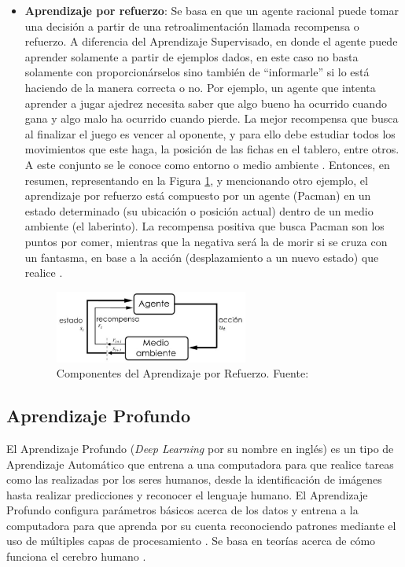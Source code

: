 \begin{itemize}
	\item \textbf{Aprendizaje por refuerzo}: Se basa en que un agente racional puede tomar una decisión a partir de una retroalimentación llamada recompensa o refuerzo. A diferencia del Aprendizaje Supervisado, en donde el agente puede aprender solamente a partir de ejemplos dados, en este caso no basta solamente con proporcionárselos sino también de “informarle” si lo está haciendo de la manera correcta o no. Por ejemplo, un agente que intenta aprender a jugar ajedrez necesita saber que algo bueno ha ocurrido cuando gana y algo malo ha ocurrido cuando pierde. La mejor recompensa que busca al finalizar el juego es vencer al oponente, y para ello debe estudiar todos los movimientos que este haga, la posición de las fichas en el tablero, entre otros. A este conjunto se le conoce como entorno o medio ambiente \parencite{bk_russell2004intart}. Entonces, en resumen, representando en la Figura \ref{2:fig4}, y mencionando otro ejemplo, el aprendizaje por refuerzo está compuesto por un agente (Pacman) en un estado determinado (su ubicación o posición actual) dentro de un medio ambiente (el laberinto). La recompensa positiva que busca Pacman son los puntos por comer, mientras que la negativa será la de morir si se cruza con un fantasma, en base a la acción (desplazamiento a un nuevo estado) que realice \parencite{tec_merino2019aprendrefuerzo}.
	\begin{figure}[h]
		\begin{center}
			\includegraphics[width=0.60\textwidth]{2/figures/aprendizaje_refuerzo.jpg}
			\caption{Componentes del Aprendizaje por Refuerzo. Fuente: \cite{bk_sutton2018rl}}
			\label{2:fig4}
		\end{center}
	\end{figure}
\end{itemize}

\clearpage

\subsection{Aprendizaje Profundo}

El Aprendizaje Profundo (\textit{Deep Learning} por su nombre en inglés) es un tipo de Aprendizaje Automático que entrena a una computadora para que realice tareas como las realizadas por los seres humanos, desde la identificación de imágenes hasta realizar predicciones y reconocer el lenguaje humano. El Aprendizaje Profundo configura parámetros básicos acerca de los datos y entrena a la computadora para que aprenda por su cuenta reconociendo patrones mediante el uso de múltiples capas de procesamiento \parencite{gl_sas_deeplearning}. Se basa en teorías acerca de cómo funciona el cerebro humano \parencite{tec_banafa2019deeplearning}.

